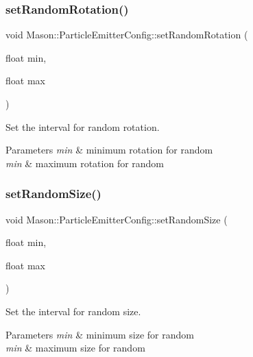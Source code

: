 \subsubsection{\texorpdfstring{set\+Random\+Rotation()}{setRandomRotation()}}
{\footnotesize\ttfamily void Mason\+::\+Particle\+Emitter\+Config\+::set\+Random\+Rotation (\begin{DoxyParamCaption}\item[{float}]{min,  }\item[{float}]{max }\end{DoxyParamCaption})\hspace{0.3cm}{\ttfamily [inline]}}



Set the interval for random rotation. 


\begin{DoxyParams}{Parameters}
{\em min} & minimum rotation for random \\
\hline
{\em min} & maximum rotation for random \\
\hline
\end{DoxyParams}
\hypertarget{struct_mason_1_1_particle_emitter_config_ab644fd902c0e29f758a53912d0784f19}{}\label{struct_mason_1_1_particle_emitter_config_ab644fd902c0e29f758a53912d0784f19} 
\subsubsection{\texorpdfstring{set\+Random\+Size()}{setRandomSize()}}
{\footnotesize\ttfamily void Mason\+::\+Particle\+Emitter\+Config\+::set\+Random\+Size (\begin{DoxyParamCaption}\item[{float}]{min,  }\item[{float}]{max }\end{DoxyParamCaption})\hspace{0.3cm}{\ttfamily [inline]}}



Set the interval for random size. 


\begin{DoxyParams}{Parameters}
{\em min} & minimum size for random \\
\hline
{\em min} & maximum size for random \\
\hline
\end{DoxyParams}
\hypertarget{struct_mason_1_1_particle_emitter_config_a9102ce5287cd4c13e89f5e695563076f}{}\label{struct_mason_1_1_particle_emitter_config_a9102ce5287cd4c13e89f5e695563076f} 
